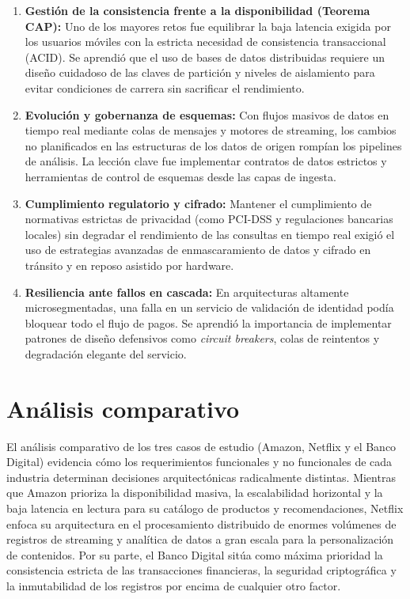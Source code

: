 \documentclass[12pt,a4paper]{article}
\begin{document}
\begin{enumerate}[label=\arabic*.]
  \item \textbf{Gestión de la consistencia frente a la disponibilidad (Teorema CAP):} Uno de los mayores retos fue equilibrar la baja latencia exigida por los usuarios móviles con la estricta necesidad de consistencia transaccional (ACID). Se aprendió que el uso de bases de datos distribuidas requiere un diseño cuidadoso de las claves de partición y niveles de aislamiento para evitar condiciones de carrera sin sacrificar el rendimiento.
  \item \textbf{Evolución y gobernanza de esquemas:} Con flujos masivos de datos en tiempo real mediante colas de mensajes y motores de streaming, los cambios no planificados en las estructuras de los datos de origen rompían los pipelines de análisis. La lección clave fue implementar contratos de datos estrictos y herramientas de control de esquemas desde las capas de ingesta.
  \item \textbf{Cumplimiento regulatorio y cifrado:} Mantener el cumplimiento de normativas estrictas de privacidad (como PCI-DSS y regulaciones bancarias locales) sin degradar el rendimiento de las consultas en tiempo real exigió el uso de estrategias avanzadas de enmascaramiento de datos y cifrado en tránsito y en reposo asistido por hardware.
  \item \textbf{Resiliencia ante fallos en cascada:} En arquitecturas altamente microsegmentadas, una falla en un servicio de validación de identidad podía bloquear todo el flujo de pagos. Se aprendió la importancia de implementar patrones de diseño defensivos como \textit{circuit breakers}, colas de reintentos y degradación elegante del servicio.
\end{enumerate}

\newpage
\section{Análisis comparativo}
El análisis comparativo de los tres casos de estudio (Amazon, Netflix y el Banco Digital) evidencia cómo los requerimientos funcionales y no funcionales de cada industria determinan decisiones arquitectónicas radicalmente distintas. Mientras que Amazon prioriza la disponibilidad masiva, la escalabilidad horizontal y la baja latencia en lectura para su catálogo de productos y recomendaciones, Netflix enfoca su arquitectura en el procesamiento distribuido de enormes volúmenes de registros de streaming y analítica de datos a gran escala para la personalización de contenidos. Por su parte, el Banco Digital sitúa como máxima prioridad la consistencia estricta de las transacciones financieras, la seguridad criptográfica y la inmutabilidad de los registros por encima de cualquier otro factor.
\end{document}
